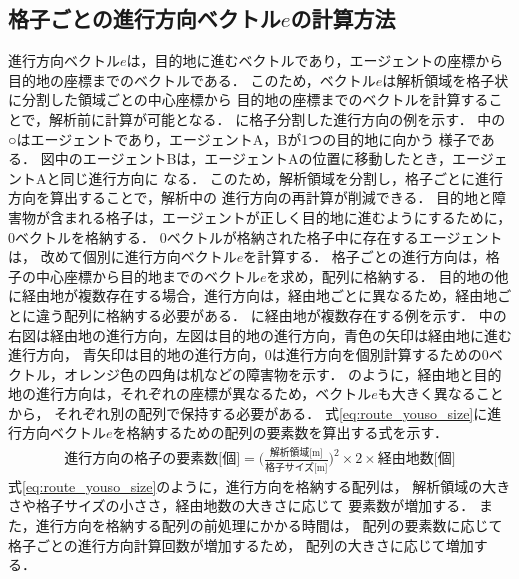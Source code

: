 \subsection{格子ごとの進行方向ベクトル$e$の計算方法}
進行方向ベクトル$e$は，目的地に進むベクトルであり，エージェントの座標から
目的地の座標までのベクトルである．
このため，ベクトル$e$は解析領域を格子状に分割した領域ごとの中心座標から
目的地の座標までのベクトルを計算することで，解析前に計算が可能となる．
に格子分割した進行方向の例を示す．
%
%
中の○はエージェントであり，エージェントA，Bが1つの目的地に向かう
様子である．
図中のエージェントBは，エージェントAの位置に移動したとき，エージェントAと同じ進行方向に
なる．
このため，解析領域を分割し，格子ごとに進行方向を算出することで，解析中の
進行方向の再計算が削減できる．
目的地と障害物が含まれる格子は，エージェントが正しく目的地に進むようにするために，
0ベクトルを格納する．
0ベクトルが格納された格子中に存在するエージェントは，
改めて個別に進行方向ベクトル$e$を計算する．
格子ごとの進行方向は，格子の中心座標から目的地までのベクトル$e$を求め，配列に格納する．
目的地の他に経由地が複数存在する場合，進行方向は，経由地ごとに異なるため，経由地ごとに違う配列に格納する必要がある．
に経由地が複数存在する例を示す．
中の右図は経由地の進行方向，左図は目的地の進行方向，青色の矢印は経由地に進む進行方向，
青矢印は目的地の進行方向，0は進行方向を個別計算するための0ベクトル，オレンジ色の四角は机などの障害物を示す．
のように，経由地と目的地の進行方向は，それぞれの座標が異なるため，ベクトル$e$も大きく異なることから，
それぞれ別の配列で保持する必要がある．
式\eqref{eq:route_youso_size}に進行方向ベクトル$e$を格納するための配列の要素数を算出する式を示す．
%
\begin{eqnarray}
 \mbox{進行方向の格子の要素数[個]} = 
 \big( \frac{\mbox{解析領域[m]}}{\mbox{格子サイズ[m]}} \big) ^ 2 \times  2 \times \mbox{経由地数[個]}
 \label{eq:route_youso_size}
\end{eqnarray}
%
式\eqref{eq:route_youso_size}のように，進行方向を格納する配列は，
解析領域の大きさや格子サイズの小ささ，経由地数の大きさに応じて
要素数が増加する．
また，進行方向を格納する配列の前処理にかかる時間は，
配列の要素数に応じて格子ごとの進行方向計算回数が増加するため，
配列の大きさに応じて増加する．

